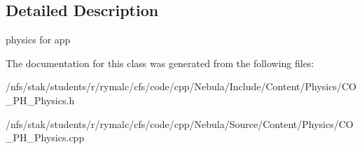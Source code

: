 \subsection{Detailed Description}
physics for app 

The documentation for this class was generated from the following files:\begin{DoxyCompactItemize}
\item 
/nfs/stak/students/r/rymalc/cfs/code/cpp/Nebula/Include/Content/Physics/CO\_\-PH\_\-Physics.h\item 
/nfs/stak/students/r/rymalc/cfs/code/cpp/Nebula/Source/Content/Physics/CO\_\-PH\_\-Physics.cpp\end{DoxyCompactItemize}

